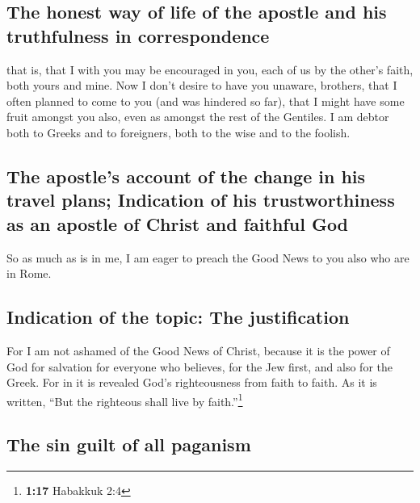 \hypertarget{the-honest-way-of-life-of-the-apostle-and-his-truthfulness-in-correspondence}{%
\subsection{The honest way of life of the apostle and his truthfulness
in
correspondence}\label{the-honest-way-of-life-of-the-apostle-and-his-truthfulness-in-correspondence}}

 that is, that I with you may be encouraged in you, each
of us by the other's faith, both yours and mine.  Now I
don't desire to have you unaware, brothers, that I often planned to come
to you (and was hindered so far), that I might have some fruit amongst
you also, even as amongst the rest of the Gentiles.  I am
debtor both to Greeks and to foreigners, both to the wise and to the
foolish.

\hypertarget{the-apostles-account-of-the-change-in-his-travel-plans-indication-of-his-trustworthiness-as-an-apostle-of-christ-and-faithful-god}{%
\subsection{The apostle's account of the change in his travel plans;
Indication of his trustworthiness as an apostle of Christ and faithful
God}\label{the-apostles-account-of-the-change-in-his-travel-plans-indication-of-his-trustworthiness-as-an-apostle-of-christ-and-faithful-god}}

 So as much as is in me, I am eager to preach the Good
News to you also who are in Rome.

\hypertarget{indication-of-the-topic-the-justification}{%
\subsection{Indication of the topic: The
justification}\label{indication-of-the-topic-the-justification}}

 For I am not ashamed of the Good News of Christ, because
it is the power of God for salvation for everyone who believes, for the
Jew first, and also for the Greek.  For in it is revealed
God's righteousness from faith to faith. As it is written, ``But the
righteous shall live by faith.''\footnote{\textbf{1:17} Habakkuk 2:4}

\hypertarget{the-sin-guilt-of-all-paganism}{%
\subsection{The sin guilt of all
paganism}\label{the-sin-guilt-of-all-paganism}}

